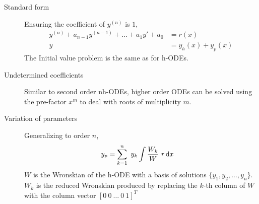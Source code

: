 \begin{description}
    \item[Standard form] Ensuring the coefficient of $ y^{(n)} $ is $ 1 $,
        \begin{align}
            y^{(n)} + a_{n-1}y^{(n-1)} + \dots + a_{1}y' + a_{0} & = r(x)                \\
            y                                                    & = y_{h}(x) + y_{p}(x)
        \end{align}
        The Initial value problem is the same as for h-ODEs.
    \item[Undetermined coefficients] Similar to second order nh-ODEs, higher order ODEs
        can be solved using the pre-factor $ x^{m} $ to deal with roots of multiplicity $ m $.
    \item[Variation of parameters] Generalizing to order $ n $,
        \begin{align}
            y_{p} & = \sum_{k = 1}^{n}\ y_{k} \int \frac{W_{k}}{W}\ r \dl x
        \end{align}
        $ W $ is the Wronskian of the h-ODE with a basis of solutions $ \{y_{1}, y_{2},
            \dots,y_{n}\} $. $ W_{k} $ is the reduced Wronskian produced by replacing the
        $ k $-th column of $ W $ with the column vector $ [0\ 0\ \dots\ 0\ 1]^{T} $
\end{description}
